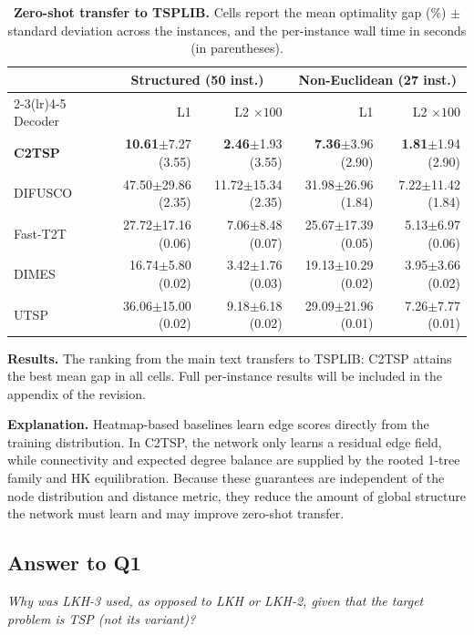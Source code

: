 \begin{table}[h]
\centering
\caption{\textbf{Zero-shot transfer to TSPLIB.} Cells report the mean optimality gap (\%) $\pm$ standard deviation across the instances, and the per-instance wall time in seconds (in parentheses).}
\small
\setlength{\tabcolsep}{4pt}
\begin{tabular}{lrrrr}
\toprule
 & \multicolumn{2}{c}{Structured (50 inst.)} & \multicolumn{2}{c}{Non-Euclidean (27 inst.)} \\
\cmidrule(lr){2-3}\cmidrule(lr){4-5}
Decoder & L1 & L2 $\times 100$ & L1 & L2 $\times 100$ \\
\midrule
\textbf{C2TSP} & \textbf{10.61}$\pm$7.27 (3.55) & \textbf{2.46}$\pm$1.93 (3.55) & \textbf{7.36}$\pm$3.96 (2.90) & \textbf{1.81}$\pm$1.94 (2.90) \\
DIFUSCO & 47.50$\pm$29.86 (2.35) & 11.72$\pm$15.34 (2.35) & 31.98$\pm$26.96 (1.84) & 7.22$\pm$11.42 (1.84) \\
Fast-T2T & 27.72$\pm$17.16 (0.06) & 7.06$\pm$8.48 (0.07) & 25.67$\pm$17.39 (0.05) & 5.13$\pm$6.97 (0.06) \\
DIMES & 16.74$\pm$5.80 (0.02) & 3.42$\pm$1.76 (0.03) & 19.13$\pm$10.29 (0.02) & 3.95$\pm$3.66 (0.02) \\
UTSP & 36.06$\pm$15.00 (0.02) & 9.18$\pm$6.18 (0.02) & 29.09$\pm$21.96 (0.01) & 7.26$\pm$7.77 (0.01) \\
\bottomrule
\end{tabular}
\end{table}

\textbf{Results.}
The ranking from the main text transfers to TSPLIB: C2TSP attains the best mean gap in all cells. Full per-instance results will be included in the appendix of the revision.

\textbf{Explanation.}
Heatmap-based baselines learn edge scores directly from the training distribution. In C2TSP, the network only learns a residual edge field, while connectivity and expected degree balance are supplied by the rooted 1-tree family and HK equilibration. Because these guarantees are independent of the node distribution and distance metric, they reduce the amount of global structure the network must learn and may improve zero-shot transfer.


\subsection{Answer to Q1}

\textit{Why was LKH-3 used, as opposed to LKH or LKH-2, given that the target problem is TSP (not its variant)?}

